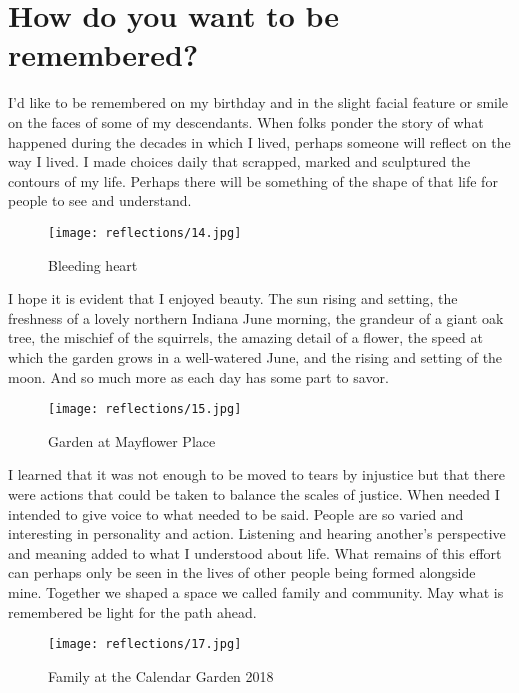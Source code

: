\section{How do you want to be remembered?}
I'd like to be remembered on my birthday and in the slight facial feature or smile on the faces of some of my descendants.
When folks ponder the story of what happened during the decades in which I lived, perhaps someone will reflect on the way I lived.
I made choices daily that scrapped, marked and sculptured the contours of my life.
Perhaps there will be something of the shape of that life for people to see and understand.

\begin{figure}
\centering
\texttt{[image: reflections/14.jpg]}
\caption{
Bleeding heart
}
\end{figure}

I hope it is evident that I enjoyed beauty.
The sun rising and setting, the freshness of a lovely northern Indiana June morning, the grandeur of a giant oak tree, the mischief of the squirrels, the amazing detail of a flower, the speed at which the garden grows in a well-watered June, and the rising and setting of the moon.
And so much more as each day has some part to savor.

\begin{figure}
\centering
\texttt{[image: reflections/15.jpg]}
\caption{
Garden at Mayflower Place
}
\end{figure}

I learned that it was not enough to be moved to tears by injustice but that there were actions that could be taken to balance the scales of justice.
When needed I intended to give voice to what needed to be said.
People are so varied and interesting in personality and action.
Listening and hearing another's perspective and meaning added to what I understood about life.
What remains of this effort can perhaps only be seen in the lives of other people being formed alongside mine.
Together we shaped a space we called family and community.
May what is remembered be light for the path ahead.

\begin{figure}
\centering
\texttt{[image: reflections/17.jpg]}
\caption{
Family at the Calendar Garden 2018
}
\end{figure}






